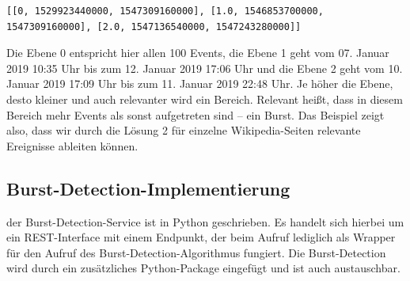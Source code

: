 \begin{lstlisting}[label=Solution2_Layers,caption=Ebene 0\, 1 und 2 der Burst-Detectionen,language=epl,firstnumber=1,captionpos=b]
[[0, 1529923440000, 1547309160000], [1.0, 1546853700000, 1547309160000], [2.0, 1547136540000, 1547243280000]]
\end{lstlisting}

Die Ebene 0 entspricht hier allen 100 Events, die Ebene 1 geht vom 07. Januar 2019 10:35 Uhr bis zum 12. Januar 2019 17:06 Uhr und die
Ebene 2 geht vom 10. Januar 2019 17:09 Uhr bis zum 11. Januar 2019 22:48 Uhr. Je höher die Ebene, desto kleiner und auch
relevanter wird ein Bereich. Relevant heißt, dass in diesem Bereich mehr Events als sonst aufgetreten sind -- ein Burst.
Das Beispiel zeigt also, dass wir durch die Lösung 2 für einzelne Wikipedia-Seiten relevante Ereignisse ableiten können.

\subsection{Burst-Detection-Implementierung}
der Burst-Detection-Service ist in Python geschrieben. Es handelt sich hierbei um ein REST-Interface mit einem Endpunkt,
der beim Aufruf lediglich als Wrapper für den Aufruf des Burst-Detection-Algorithmus fungiert. Die Burst-Detection wird durch ein
zusätzliches Python-Package eingefügt und ist auch austauschbar.